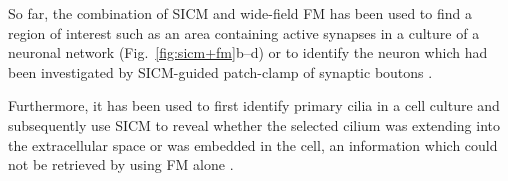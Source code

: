 So far, the combination of SICM and wide-field FM has been used to find a
region of interest such as an area containing active synapses in a culture of
a neuronal network \cite{Scheenen2015} (Fig.~\ref{fig:sicm+fm}b--d) or to
identify the neuron which had been investigated by SICM-guided patch-clamp of
synaptic boutons \cite{Novak2013}.

Furthermore, it has been used to first identify primary cilia in a cell
culture and subsequently use SICM to reveal whether the selected cilium was
extending into the extracellular space or was embedded in the cell, an
information which could not be retrieved by using FM alone \cite{Zhou2018}.





